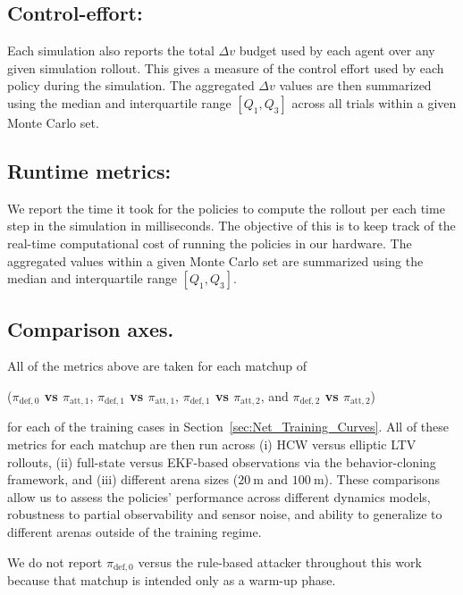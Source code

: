 \subsection*{Control-effort:}

Each simulation also reports the total \(\Delta v\) budget used by each agent over any given simulation rollout. This gives a measure of the control effort used by each policy during the simulation. The aggregated \(\Delta v\) values are then summarized using the median and interquartile range \([Q_1,Q_3]\)
across all trials within a given Monte Carlo set.

\subsection*{Runtime metrics:}

We report the time it took for the policies to compute the rollout per each time step in the simulation in milliseconds. The objective of this is to keep track of the real-time computational cost of running the policies in our hardware. The aggregated values within a given Monte Carlo set are summarized using the median and interquartile range \([Q_1,Q_3]\).


\subsection*{Comparison axes.}
All of the metrics above are taken for each matchup of 

({\boldmath\textbf{$\pi_{\mathrm{def},0}$ vs $\pi_{\mathrm{att},1}$}}, {\boldmath\textbf{$\pi_{\mathrm{def},1}$ vs $\pi_{\mathrm{att},1}$}}, {\boldmath\textbf{$\pi_{\mathrm{def},1}$ vs $\pi_{\mathrm{att},2}$}}, and {\boldmath\textbf{$\pi_{\mathrm{def},2}$ vs $\pi_{\mathrm{att},2}$}}) 


for each of the training cases in Section~\ref{sec:Net_Training_Curves}. All of these metrics for each matchup are then run across (i) HCW versus elliptic LTV rollouts, (ii) full-state versus EKF-based observations via the behavior-cloning framework, and (iii) different arena sizes ($20~\mathrm{m}$ and $100~\mathrm{m}$). These comparisons allow us to assess the policies' performance across different dynamics models, robustness to partial observability and sensor noise, and ability to generalize to different arenas outside of the training regime.

We do not report {\boldmath\textbf{$\pi_{\mathrm{def},0}$}} versus the rule-based attacker throughout this work because that matchup is intended only as a warm-up phase.


